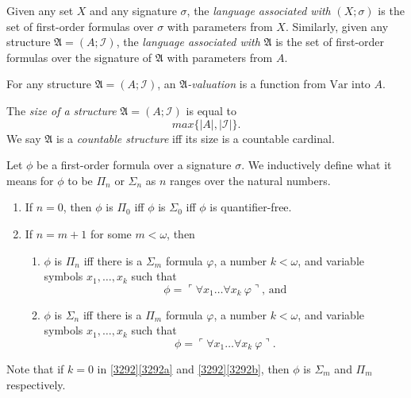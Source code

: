 \documentclass[12pt]{article}
\numberwithin{equation}{section}
\begin{document}
\begin{defi}
Given any set $X$ and any signature $\sigma$, the \emph{language associated with} $(X; \sigma)$ is the set of first-order formulas over $\sigma$ with parameters from $X$. Similarly, given any structure $\mathfrak{A} = (A; \mathcal{I})$, the \emph{language associated with} $\mathfrak{A}$ is the set of first-order formulas over the signature of $\mathfrak{A}$ with parameters from $A$.
\end{defi}

\begin{defi}
For any structure $\mathfrak{A} = (A; \mathcal{I})$, an $\mathfrak{A}$\emph{-valuation} is a function from $\mathrm{Var}$ into $A$.
\end{defi}

\begin{defi}
The \emph{size of a structure} $\mathfrak{A} = (A; \mathcal{I})$ is equal to $$max\{|A|, |\mathcal{I}|\}.$$ We say $\mathfrak{A}$ is a \emph{countable structure} iff its size is a countable cardinal.
\end{defi}

\begin{defi}\label{def25}
Let $\phi$ be a first-order formula over a signature $\sigma$. We inductively define what it means for $\phi$ to be $\Pi_n$ or $\Sigma_n$ as $n$ ranges over the natural numbers.
\begin{enumerate}[label=(\arabic*)]
    \item If $n = 0$, then $\phi$ is $\Pi_0$ iff $\phi$ is $\Sigma_0$ iff $\phi$ is quantifier-free.
    \item\label{3292} If $n = m + 1$ for some $m < \omega$, then 
    \begin{enumerate}[label=(\alph*)]
        \item\label{3292a} $\phi$ is $\Pi_n$ iff there is a $\Sigma_m$ formula $\varphi$, a number $k < \omega$, and variable symbols $x_1, \dots, x_k$ such that 
        \begin{equation*}
            \phi = \ulcorner \forall x_1 \dots \forall x_k \ \varphi \urcorner \text{, and}
        \end{equation*}
        \item\label{3292b} $\phi$ is $\Sigma_n$ iff there is a $\Pi_m$ formula $\varphi$, a number $k < \omega$, and variable symbols $x_1, \dots, x_k$ such that 
        \begin{equation*}
            \phi = \ulcorner \forall x_1 \dots \forall x_k \ \varphi \urcorner \text{.}
        \end{equation*}
    \end{enumerate}
\end{enumerate}
Note that if $k = 0$ in \ref{3292}\ref{3292a} and \ref{3292}\ref{3292b}, then $\phi$ is $\Sigma_m$ and $\Pi_m$ respectively.
\end{defi}
\end{document}
